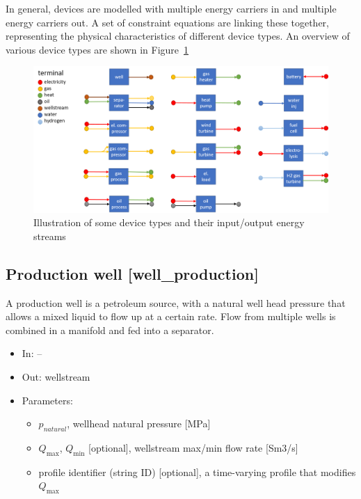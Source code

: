 \documentclass[12pt]{article}
\begin{document}
In general, devices are modelled with multiple energy carriers in and multiple energy carriers out. A set of constraint equations are linking these together, representing the physical characteristics of different device types. An overview of various device types are shown in Figure~\ref{fig:devicetypes}


\begin{figure}[]
\centering
		\includegraphics[width=\columnwidth]{./media/device_types.png}
		\caption{Illustration of some device types and their input/output energy streams }
		\label{fig:devicetypes}
\end{figure}



\subsection{Production well [well\_production]}

A production well is a petroleum source, with a natural well head pressure that allows a mixed liquid to flow up at a certain rate. Flow from multiple wells is combined in a manifold and fed into a separator.

\begin{itemize}
\item In: --
\item Out: wellstream
\item Parameters:
\begin{itemize}[noitemsep,topsep=0pt]
	\item $p_{natural}$,  wellhead natural pressure [MPa]
	\item $Q_\text{max}$, $Q_\text{min}$ [optional], wellstream max/min flow rate [Sm3/s]
	\item profile identifier (string ID) [optional], a time-varying profile that modifies $Q_\text{max}$
\end{itemize}
\end{itemize}
\end{document}
